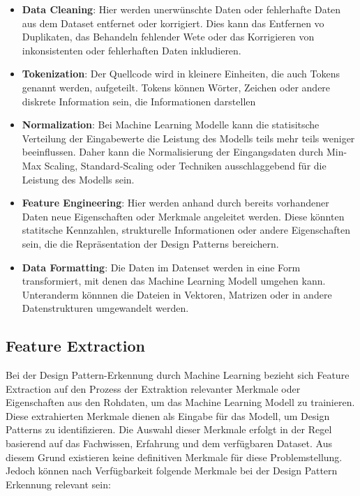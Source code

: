 \documentclass[conference]{IEEEtran}
\begin{document}
\begin{itemize}
    \item \textbf{Data Cleaning}: Hier werden unerwünschte Daten oder fehlerhafte Daten aus dem Dataset entfernet oder korrigiert. Dies kann das Entfernen vo Duplikaten, das Behandeln fehlender Wete oder das Korrigieren von inkonsistenten oder fehlerhaften Daten inkludieren.
    \item \textbf{Tokenization}: Der Quellcode wird in kleinere Einheiten, die auch Tokens genannt werden, aufgeteilt. Tokens können Wörter, Zeichen oder andere diskrete Information sein, die Informationen darstellen
    \item \textbf{Normalization}: Bei Machine Learning Modelle kann die statisitsche Verteilung der Eingabewerte die Leistung des Modells teils mehr teils weniger beeinflussen. Daher kann die Normalisierung der Eingangsdaten durch Min-Max Scaling, Standard-Scaling oder Techniken ausschlaggebend für die Leistung des Modells sein.
    \item \textbf{Feature Engineering}: Hier werden anhand durch bereits vorhandener Daten neue Eigenschaften oder Merkmale angeleitet werden. Diese könnten statitsche Kennzahlen, strukturelle Informationen oder andere Eigenschaften sein, die die Repräsentation der Design Patterns bereichern.
    \item \textbf{Data Formatting}: Die Daten im Datenset werden in eine Form transformiert, mit denen das Machine Learning Modell umgehen kann. Unteranderm könnnen die Dateien in Vektoren, Matrizen oder in andere Datenstrukturen umgewandelt werden.
\end{itemize}

\newpage

\subsection{Feature Extraction}

Bei der Design Pattern-Erkennung durch Machine Learning bezieht sich Feature Extraction auf den Prozess der Extraktion relevanter Merkmale oder Eigenschaften aus den Rohdaten, um das Machine Learning Modell zu trainieren.
Diese extrahierten Merkmale dienen als Eingabe für das Modell, um Design Patterns zu identifizieren. Die Auswahl dieser Merkmale erfolgt in der Regel basierend auf das Fachwissen, Erfahrung und dem verfügbaren Dataset.
Aus diesem Grund existieren keine definitiven Merkmale für diese Problemstellung. Jedoch können nach Verfügbarkeit folgende Merkmale bei der Design Pattern Erkennung relevant sein:
\end{document}
